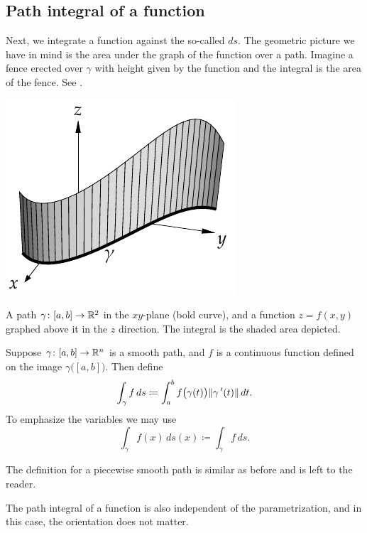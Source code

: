\subsection{Path integral of a function}

Next, we integrate a function against the so-called
\emph{} $ds$.  The geometric picture we have in mind
is the area under the graph of the function over a path.
Imagine a fence erected over $\gamma$ with height given by the function
and the integral is the area of the fence.
See .
\begin{myfigureht}
\includegraphics{figures/fenceintegral}
\caption{A path $\gamma \colon [a,b] \to {\mathbb{R}}^2$ in the $xy$-plane (bold curve), and a function
$z=f(x,y)$ graphed above it in the $z$ direction.  The integral is the
shaded area depicted.\label{fig:fenceintegral}}
\end{myfigureht}

\begin{defn}
Suppose $\gamma \colon [a,b] \to {\mathbb{R}}^n$ is a smooth path, and $f$ is a
continuous function defined on the image $\gamma\bigl([a,b]\bigr)$.  Then
define
\begin{equation*}
\int_{\gamma} f \,ds \coloneqq
\int_a^b f\bigl( \gamma(t) \bigr) \lVert {\gamma^{\:\prime}(t)} \rVert \, dt .
\end{equation*}
To emphasize the variables we may use
\begin{equation*}
\int_{\gamma} f(x) \,ds(x) \coloneqq \int_{\gamma} f \,ds .
\end{equation*}

The definition for a piecewise smooth path is similar as before and is left
to the reader.
\end{defn}

The path integral of a function is also independent of the parametrization,
and in this case, the orientation does not matter.

